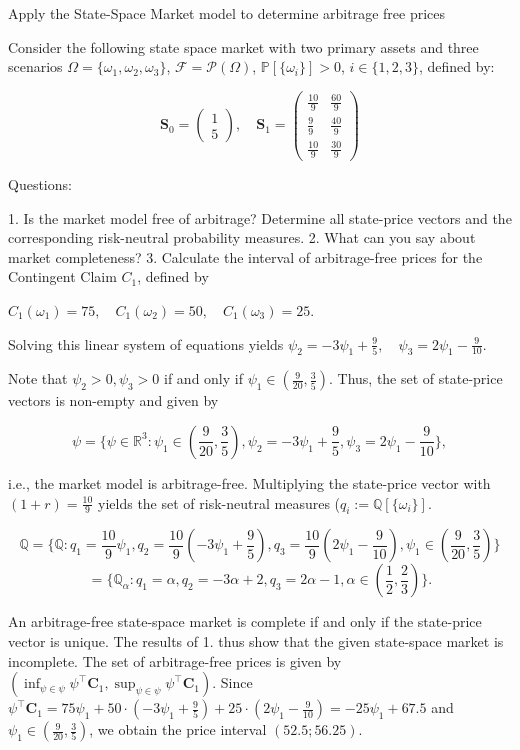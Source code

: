 Apply the State-Space Market model to determine arbitrage free prices

Consider the following state space market with two primary assets and three scenarios 
\(\Omega = \{\omega_1, \omega_2, \omega_3\}\), 
\(\mathcal{F} = \mathcal{P}(\Omega)\), 
\(\mathbb{P}[\{\omega_i\}] > 0\), \(i \in \{1, 2, 3\}\), defined by:

\[
\boldsymbol{S}_0 = \begin{pmatrix} 1 \\ 5 \end{pmatrix}, \quad \boldsymbol{S}_1 = \begin{pmatrix} 
\frac{10}{9} & \frac{60}{9} \\
\frac{9}{9} & \frac{40}{9} \\
\frac{10}{9} & \frac{30}{9} 
\end{pmatrix}
\]

Questions:

1. Is the market model free of arbitrage? Determine all state-price vectors and the corresponding risk-neutral probability measures.
2. What can you say about market completeness?
3. Calculate the interval of arbitrage-free prices for the Contingent Claim \(C_1\), defined by

\(C_1(\omega_1) = 75, \quad C_1(\omega_2) = 50, \quad C_1(\omega_3) = 25.\)

Solving this linear system of equations yields 
\(\psi_2 = -3 \psi_1 + \frac{9}{5}, \quad \psi_3 = 2 \psi_1 - \frac{9}{10}.\)

Note that \(\psi_2 > 0, \psi_3 > 0\) if and only if \(\psi_1 \in \left( \frac{9}{20}, \frac{3}{5} \right)\). 
Thus, the set of state-price vectors is non-empty and given by

\[
\psi = \{\psi \in \mathbb{R}^3: \psi_1 \in \left( \frac{9}{20}, \frac{3}{5} \right), \psi_2 = -3 \psi_1 + \frac{9}{5}, \psi_3 = 2 \psi_1 - \frac{9}{10} \},
\]

i.e., the market model is arbitrage-free. Multiplying the state-price vector with 
\( (1 + r) = \frac{10}{9} \) yields the set of risk-neutral measures (\( q_i := \mathbb{Q}[\{\omega_i\}] \).

\[
\mathbb{Q} = \{\mathbb{Q}: q_1 = \frac{10}{9} \psi_1, q_2 = \frac{10}{9}(-3 \psi_1 + \frac{9}{5}), q_3 = \frac{10}{9}(2 \psi_1 - \frac{9}{10}), \psi_1 \in \left( \frac{9}{20}, \frac{3}{5} \right) \}
\]
\[
= \{\mathbb{Q}_\alpha: q_1 = \alpha, q_2 = -3\alpha + 2, q_3 = 2\alpha - 1, \alpha \in \left(\frac{1}{2}, \frac{2}{3}\right) \}.
\]

An arbitrage-free state-space market is complete if and only if the state-price vector is unique. 
The results of 1. thus show that the given state-space market is incomplete.
The set of arbitrage-free prices is given by 
\(\left( \inf_{\psi \in \psi} \psi^\top \boldsymbol{C}_1, \sup_{\psi \in \psi} \psi^\top \boldsymbol{C}_1 \right).\)
Since 
\(\psi^\top \boldsymbol{C}_1 = 75 \psi_1 + 50 \cdot \left(-3 \psi_1 + \frac{9}{5} \right) + 25 \cdot \left(2 \psi_1 - \frac{9}{10} \right) = -25 \psi_1 + 67.5\)
and \(\psi_1 \in \left( \frac{9}{20}, \frac{3}{5} \right)\), we obtain the price interval \((52.5; 56.25).\)
